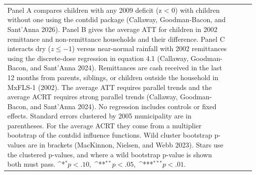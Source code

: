 \documentclass[12pt]{article}
\def\sym#1{\ifmmode^{#1}\else\(^{#1}\)\fi}
\begin{document}
\begin{longtable}{l*{3}{c}}
{Panel A compares children with any 2009 deficit (z < 0) with children without one using the contdid package (Callaway, Goodman-Bacon, and Sant'Anna 2026). Panel B gives the average ATT for children in 2002 remittance and non-remittance households and their difference. Panel C interacts dry (\ensuremath{z\le -1}) versus near-normal rainfall with 2002 remittances using the discrete-dose regression in equation 4.1 (Callaway, Goodman-Bacon, and Sant'Anna 2024).
Remittances are cash received in the last 12 months from parents, siblings, or children outside the household in MxFLS-1 (2002). The average ATT requires parallel trends and the average ACRT requires strong parallel trends (Callaway, Goodman-Bacon, and Sant'Anna 2024). No regression includes controls or fixed effects.
Standard errors clustered by 2005 municipality are in parentheses. For the average ACRT they come from a multiplier bootstrap of the contdid influence functions. Wild cluster bootstrap p-values are in brackets (MacKinnon, Nielsen, and Webb 2023). Stars use the clustered p-values, and where a wild bootstrap p-value is shown both must pass. \mbox{\sym{*}\(p<.10\), \sym{**}\(p<.05\), \sym{***}\(p<.01\).}}\\
\end{longtable}
\endgroup
\clearpage
\begingroup
\footnotesize
\renewcommand{\arraystretch}{0.86}
\setlength{\tabcolsep}{4pt}
\setlength{\LTcapwidth}{\textwidth}
\end{document}
